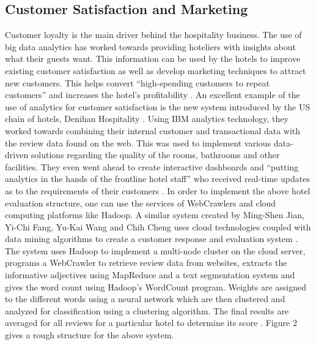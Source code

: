 \documentclass[sigconf]{acmart}
\begin{document}
\subsection{Customer Satisfaction and Marketing}
Customer loyalty is the main driver behind the hospitality business. The use of big data analytics has worked towards providing hoteliers with insights about what their guests want. This information can be used by the hotels to improve existing customer satisfaction as well as develop marketing techniques to attract new customers. This helps convert ``high-spending customers to repeat customers'' and increases the hotel's profitability \cite {mauricio05}.
\newline An excellent example of the use of analytics for customer satisfaction is the new system introduced by the US chain of hotels, Denihan Hospitality \cite {bmarr06}. Using IBM analytics technology, they worked towards combining their internal customer and transactional data with the review data found on the web. This was used to implement various data-driven solutions regarding the quality of the rooms, bathrooms and other facilities. They even went ahead to create interactive dashboards and ``putting analytics in the hands of the frontline hotel staff'' who received real-time updates as to the requirements of their customers \cite {bmarr06}. 
\newline In order to implement the above hotel evaluation structure, one can use the services of WebCrawlers and cloud computing platforms like Hadoop. A similar system created by Ming-Shen Jian, Yi-Chi Fang, Yu-Kai Wang and Chih Cheng uses cloud technologies coupled with data mining algorithms to create a  customer response and evaluation system \cite {jianfangwang07}. The system uses Hadoop to implement a multi-node cluster on the cloud server, programs a  WebCrawler to retrieve review data from websites, extracts the informative adjectives using MapReduce and a text segmentation system and gives the word count using Hadoop's WordCount program. Weights are assigned to the different words using a neural network which are then clustered and analyzed for classification using a clustering algorithm. The final results are averaged for all reviews for a particular hotel to determine its score \cite {jianfangwang07}. Figure 2 gives a rough structure for the above system.
\end{document}
